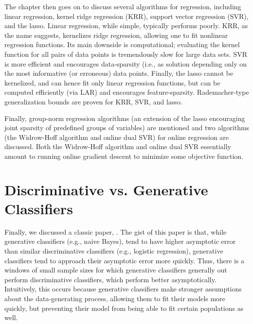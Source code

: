 \documentclass{article} %
\begin{document}
The chapter then goes on to discuss several algorithms for regression,
including linear regression, kernel ridge regression (KRR), support vector
regression (SVR), and the lasso. Linear regression, while simple, typically
performs poorly. KRR, as the name suggests, kernelizes ridge regression,
allowing one to fit nonlinear regression functions. Its main downside is
computational; evaluating the kernel function for all pairs of data points is
tremendously slow for large data sets. SVR is more efficient and encourages
data-sparsity (i.e., as solution depending only on the most informative (or
erroneous) data points. Finally, the lasso cannot be kernelized, and can hence
fit only linear regression functions, but can be computed efficiently (via LAR)
and encourages feature-sparsity. Rademacher-type generalization bounds are
proven for KRR, SVR, and lasso.

Finally, group-norm regression algorithms (an extension of the lasso
encouraging joint sparsity of predefined groups of variables) are mentioned and
two algorithms (the Widrow-Hoff algorithm and online dual SVR) for online
regression are discussed. Both the Widrow-Hoff algorithm and online dual SVR
essentially amount to running online gradient descent to minimize some
objective function.

\section{Discriminative vs. Generative Classifiers}
Finally, we discussed a classic paper, \citet{ng02discVsGen}. The gist of this
paper is that, while generative classifiers (e.g., naive Bayes), tend to have
higher asymptotic error than similar discriminative classifiers (e.g., logistic
regression), generative classifiers tend to approach their asymptotic error
more quickly. Thus, there is a windows of small sample sizes for which
generative classifiers generally out perform discriminative classifiers, which
perform better asymptotically. Intuitively, this occurs because generative
classifiers make stronger assumptions about the data-generating process,
allowing them to fit their models more quickly, but preventing their model from
being able to fit certain populations as well.
\end{document}
